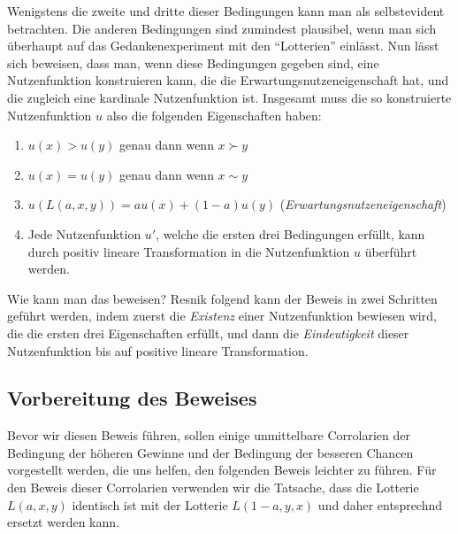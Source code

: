 Wenigstens die zweite und dritte dieser Bedingungen kann man als selbstevident
betrachten. Die anderen Bedingungen sind zumindest plausibel, wenn man sich
überhaupt auf das Gedankenexperiment mit den "`Lotterien"' einlässt.
Nun lässt sich beweisen, dass man, wenn diese
Bedingungen gegeben sind, eine Nutzenfunktion konstruieren kann, die die
Erwartungsnutzeneigenschaft hat, und die zugleich eine kardinale Nutzenfunktion
ist. Insgesamt muss die so konstruierte Nutzenfunktion $u$ also die folgenden
Eigenschaften haben:
\begin{enumerate}
  \item $u(x) > u(y)$ genau dann wenn $x \succ y$
  \item $u(x) = u(y)$ genau dann wenn $x \sim y$
  \item $u(L(a,x,y)) = au(x) + (1-a)u(y)$ ({\em Erwartungsnutzeneigenschaft})
  \item Jede Nutzenfunktion $u'$, welche die ersten drei Bedingungen erfüllt,
  kann durch positiv lineare Transformation in die Nutzenfunktion $u$ überführt
  werden.
\end{enumerate}
Wie kann man das beweisen? Resnik folgend kann der Beweis in zwei Schritten
geführt werden, indem zuerst die {\em Existenz} einer Nutzenfunktion bewiesen
wird, die die ersten drei Eigenschaften erfüllt, und dann die {\em
Eindeutigkeit} dieser Nutzenfunktion bis auf positive lineare Transformation.

\subsection{Vorbereitung des Beweises}
\label{Corrolarien}
Bevor wir diesen Beweis führen, sollen einige unmittelbare Corrolarien der
Bedingung der höheren Gewinne und der Bedingung der besseren Chancen vorgestellt
werden, die uns helfen, den folgenden Beweis leichter zu führen. Für den Beweis
dieser Corrolarien verwenden wir die Tatsache, dass die Lotterie $L(a,x,y)$
identisch ist mit der Lotterie $L(1-a,y,x)$ und daher entsprechnd ersetzt werden
kann.

